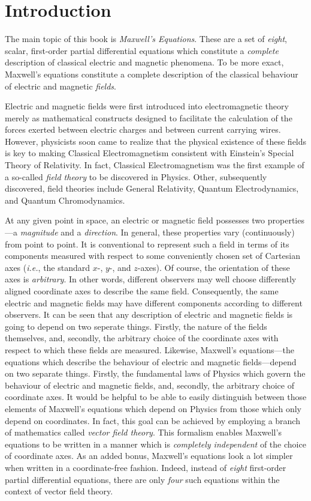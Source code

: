 \chapter{Introduction}
The main topic of this book is {\em Maxwell's Equations}. These are a set of
{\em eight},  scalar, first-order partial differential equations which constitute a 
{\em complete}\/ description of classical electric and magnetic phenomena. To be more
exact, Maxwell's equations constitute a complete description of the
classical  behaviour of electric and magnetic {\em fields}.  

Electric and magnetic fields were first introduced into electromagnetic theory merely as mathematical constructs designed to facilitate the calculation
of the forces exerted between electric charges and between current carrying wires.
However, physicists soon came to realize that  the physical existence of these fields is  key
to making Classical Electromagnetism  consistent with
Einstein's Special Theory of Relativity. In fact, Classical Electromagnetism was the first example of a so-called {\em field theory}\/ to be discovered in Physics. Other, subsequently discovered,  field theories  include General Relativity, Quantum Electrodynamics, and Quantum Chromodynamics.

At any given point in space, an electric or magnetic field possesses two
pro\-perties---a {\em magnitude}\/ and a {\em direction}. In
general, these properties
 vary (continuously) from
point to point. It is conventional to represent such a field in terms
of its components measured with respect to some conveniently chosen set of
Cartesian axes  ({\em i.e.}, the standard $x$-, $y$-, and $z$-axes). Of course, the
orientation of these axes is {\em arbitrary}. In other words, different observers
may well choose differently aligned coordinate axes  to describe the same field. 
Consequently, the same electric and magnetic fields may have different components
according to different observers. It can be seen that any description of
 electric and magnetic fields is going to depend on two seperate things. 
Firstly, the nature of the fields themselves, and, secondly, the arbitrary choice
of  the coordinate axes  with respect to which these fields are measured. 
Likewise, Maxwell's equations---the equations which describe the behaviour
of electric and magnetic fields---depend on two separate things. Firstly, the
fundamental laws of Physics which govern the behaviour of electric and magnetic
fields, and, secondly, the arbitrary choice
of  coordinate axes. It would be helpful to be able to easily distinguish between those
elements of Maxwell's equations which depend on Physics from those which
only depend on coordinates.  In fact, this goal can  be achieved  by employing a branch of mathematics called {\em vector field theory}. This formalism enables  Maxwell's
equations to be written in a manner which is {\em completely independent}\/ of the choice
of coordinate axes. As an added bonus, Maxwell's equations look a
lot simpler when written in a coordinate-free fashion. Indeed, instead of
{\em eight}\/ first-order partial differential equations, there are only
{\em four}\/ such equations within the context of vector field theory. 

